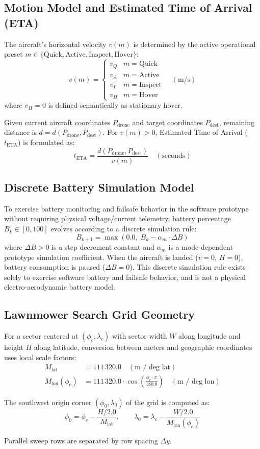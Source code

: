 \subsection{Motion Model and Estimated Time of Arrival (ETA)}
The aircraft's horizontal velocity $v(m)$ is determined by the active operational preset $m \in \{\text{Quick}, \text{Active}, \text{Inspect}, \text{Hover}\}$:
\begin{equation}
v(m) = \begin{cases}
v_Q & m = \text{Quick} \\
v_A & m = \text{Active} \\
v_I & m = \text{Inspect} \\
v_H & m = \text{Hover}
\end{cases} \quad (\text{m/s})
\end{equation}
where $v_H = 0$ is defined semantically as stationary hover.

Given current aircraft coordinates $P_{\mathrm{drone}}$ and target coordinates $P_{\mathrm{dest}}$, remaining distance is $d = d(P_{\mathrm{drone}}, P_{\mathrm{dest}})$. For $v(m) > 0$, Estimated Time of Arrival ($t_{\mathrm{ETA}}$) is formulated as:
\begin{equation}
t_{\mathrm{ETA}} = \frac{d(P_{\mathrm{drone}}, P_{\mathrm{dest}})}{v(m)} \quad (\text{seconds})
\end{equation}

\subsection{Discrete Battery Simulation Model}
To exercise battery monitoring and failsafe behavior in the software prototype without requiring physical voltage/current telemetry, battery percentage $B_k \in [0, 100]$ evolves according to a discrete simulation rule:
\begin{equation}
B_{k+1} = \max\left(0.0, \; B_k - \alpha_m \cdot \Delta B\right)
\end{equation}
where $\Delta B > 0$ is a step decrement constant and $\alpha_m$ is a mode-dependent prototype simulation coefficient. When the aircraft is landed ($v = 0$, $H = 0$), battery consumption is paused ($\Delta B = 0$). This discrete simulation rule exists solely to exercise software battery and failsafe behavior, and is not a physical electro-aerodynamic battery model.

\subsection{Lawnmower Search Grid Geometry}
For a sector centered at $(\phi_c, \lambda_c)$ with sector width $W$ along longitude and height $H$ along latitude, conversion between meters and geographic coordinates uses local scale factors:
\begin{align}
M_{\mathrm{lat}} &= 111\,320.0 \quad (\text{m / deg lat}) \\
M_{\mathrm{lon}}(\phi_c) &= 111\,320.0 \cdot \cos\left(\frac{\phi_c \cdot \pi}{180.0}\right) \quad (\text{m / deg lon})
\end{align}

The southwest origin corner $(\phi_0, \lambda_0)$ of the grid is computed as:
\begin{equation}
\phi_0 = \phi_c - \frac{H / 2.0}{M_{\mathrm{lat}}}, \qquad \lambda_0 = \lambda_c - \frac{W / 2.0}{M_{\mathrm{lon}}(\phi_c)}
\end{equation}

Parallel sweep rows are separated by row spacing $\Delta y$.
